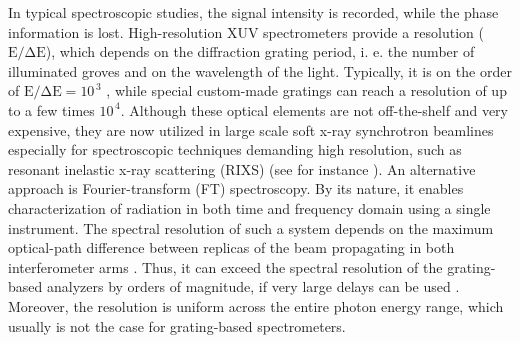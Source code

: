 \documentclass[fleqn,10pt]{wlscirep}
\begin{document}
In typical spectroscopic studies, the signal intensity is recorded, while the phase information is lost. High-resolution XUV spectrometers provide a resolution ($\mathrm{E/\Delta E}$), which depends on the diffraction grating period, i. e. the number of illuminated groves and on the wavelength of the light. Typically, it is on the order of $\mathrm{E/\Delta E=10^{\,3}}$ \cite{Wunsche2019}, while special custom-made gratings can reach a resolution of up to a few times $10^{\,4}$. Although these optical elements are not off-the-shelf and very expensive, they are now utilized in large scale soft x-ray synchrotron beamlines especially for spectroscopic techniques demanding high resolution, such as resonant inelastic x-ray scattering (RIXS) (see for instance \cite{Singh2021}). An alternative approach is Fourier-transform (FT) spectroscopy. By its nature, it enables characterization of radiation in both time and frequency domain using a single instrument. The spectral resolution of such a system depends on the maximum optical-path difference between replicas of the beam propagating in both interferometer arms \cite{Bates1976}. Thus, it can exceed the spectral resolution of the grating-based analyzers by orders of magnitude, if very large delays can be used \cite{Oliveira2011}. Moreover, the resolution is uniform across the entire photon energy range, which usually is not the case for grating-based spectrometers.\\
\end{document}
